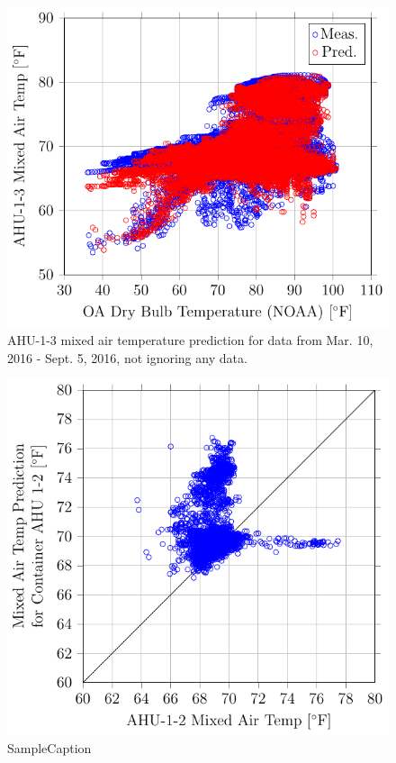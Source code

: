 \begin{figure}
\centering
\includegraphics[]{Plots/2016-09-07-0943-AHU13MixedAirTempvsOADryBulbTemperatureNOAA.pdf}
\caption{AHU-1-3 mixed air temperature prediction for data from Mar. 10, 2016 - Sept. 5, 2016, not ignoring any data.}
\label{fig:AHU13MixedAirTempvsOADryBulbTemperatureNOAA-2}
\end{figure}




\begin{figure}
\centering
\includegraphics[]{Plots/2016-09-07-1335-MixedAirTempPredictionforContainerAHU12vsAHU12MixedAirTemp.pdf}
\caption{SampleCaption}
\label{fig:2016-09-07-1335-MixedAirTempPredictionforContainerAHU12vsAHU12MixedAirTemp}
\end{figure}

